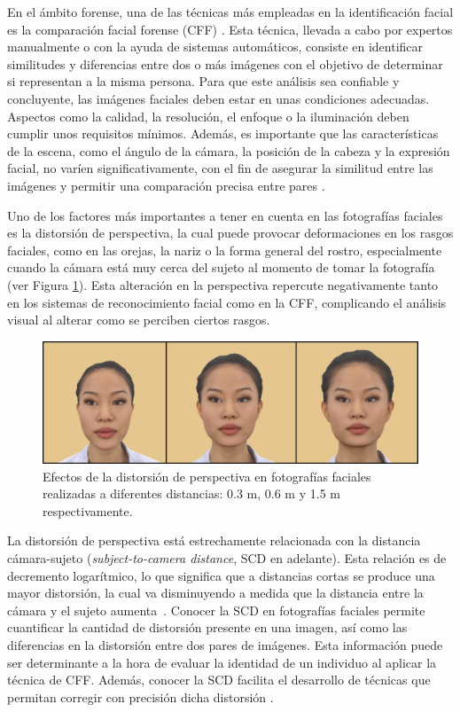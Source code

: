 En el ámbito forense, una de las técnicas más empleadas en la identificación facial es la comparación facial forense (CFF) \cite{3}. Esta técnica, llevada a cabo por expertos manualmente o con la ayuda de sistemas automáticos, consiste en identificar similitudes y diferencias entre dos o más imágenes con el objetivo de determinar si representan a la misma persona. 
Para que este análisis sea confiable y concluyente, las imágenes faciales deben estar en unas condiciones adecuadas. Aspectos como la calidad, la resolución, el enfoque o la iluminación deben cumplir unos requisitos mínimos. Además, es importante que las características de la escena, como el ángulo de la cámara, la posición de la cabeza y la expresión facial, no varíen significativamente, con el fin de asegurar la similitud entre las imágenes y permitir una comparación precisa entre pares \cite{1,2}.

Uno de los factores más importantes a tener en cuenta en las fotografías faciales es la distorsión de perspectiva, la cual puede provocar deformaciones en los rasgos faciales, como en las orejas, la nariz o la forma general del rostro, especialmente cuando la cámara está muy cerca del sujeto al momento de tomar la fotografía~\cite{12} (ver Figura \ref{fig2}). 
Esta alteración en la perspectiva repercute negativamente tanto en los sistemas de reconocimiento facial como en la CFF, complicando el análisis visual al alterar como se perciben ciertos rasgos.

\begin{figure}[h]
	\centering
	\includegraphics[scale=0.25]{imagenes/cap1/scd_distorsion3.png}
	\caption[Efectos de la distorsión de perspectiva en fotografías faciales.]{Efectos de la distorsión de perspectiva en fotografías faciales realizadas a diferentes distancias: 0.3 m, 0.6 m y 1.5 m respectivamente.}
	\label{fig2}
\end{figure}

La distorsión de perspectiva está estrechamente relacionada con la distancia cámara-sujeto (\textit{subject-to-camera distance}, SCD en adelante). Esta relación es de decremento logarítmico, lo que significa que a distancias cortas se produce una mayor distorsión, la cual va disminuyendo a medida que la distancia entre la cámara y el sujeto aumenta~\cite{55}. Conocer la SCD en fotografías faciales permite cuantificar la cantidad de distorsión presente en una imagen, así como las diferencias en la distorsión entre dos pares de imágenes. Esta información puede ser determinante a la hora de evaluar la identidad de un individuo al aplicar la técnica de CFF. Además, conocer la SCD facilita el desarrollo de técnicas que permitan corregir con precisión dicha distorsión \cite{16}.

